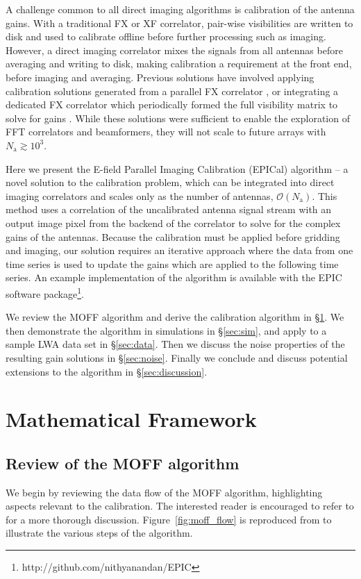 \documentclass[a4paper,fleqn,usenatbib]{../mnras}
\newcommand{\Nant}{\ensuremath{N_{\mathrm{a}}}}
\begin{document}
A challenge common to all direct imaging algorithms is calibration of the antenna gains. With a traditional FX or XF correlator, pair-wise visibilities are written to disk and used to calibrate offline before further processing such as imaging. However, a direct imaging correlator mixes the signals from all antennas before averaging and writing to disk, making calibration a requirement at the front end, before imaging and averaging. Previous solutions have involved applying calibration solutions generated from a parallel FX correlator \citep{zhe14, fos14}, or integrating a dedicated FX correlator which periodically formed the full visibility matrix to solve for gains \citep{wij09,dev09}. While these solutions were sufficient to enable the exploration of FFT correlators and beamformers, they will not scale to future arrays with $\Nant \gtrsim 10^3$.

Here we present the E-field Parallel Imaging Calibration (EPICal) algorithm -- a novel solution to the calibration problem, which can be integrated into direct imaging correlators and scales only as the number of antennas, $\mathcal{O}(\Nant)$. This method uses a correlation of the uncalibrated antenna signal stream with an output image pixel from the backend of the correlator to solve for the complex gains of the antennas. Because the calibration must be applied before gridding and imaging, our solution requires an iterative approach where the data from one time series is used to update the gains which are applied to the following time series. An example implementation of the algorithm is available with the EPIC software package\footnote{http://github.com/nithyanandan/EPIC}.

We review the MOFF algorithm and derive the calibration algorithm in \S \ref{sec:math}. We then demonstrate the algorithm in simulations in \S \ref{sec:sim}, and apply to a sample LWA data set in \S \ref{sec:data}. Then we discuss the noise properties of the resulting gain solutions in \S \ref{sec:noise}. Finally we conclude and discuss potential extensions to the algorithm in \S \ref{sec:discussion}.

\section{Mathematical Framework}\label{sec:math}
\subsection{Review of the MOFF algorithm}
We begin by reviewing the data flow of the MOFF algorithm, highlighting aspects relevant to the calibration. The interested reader is encouraged to refer to \citealt{mor11} for a more thorough discussion. Figure~\ref{fig:moff_flow} is reproduced from \citealt{thy15c} to illustrate the various steps of the algorithm.
\end{document}
